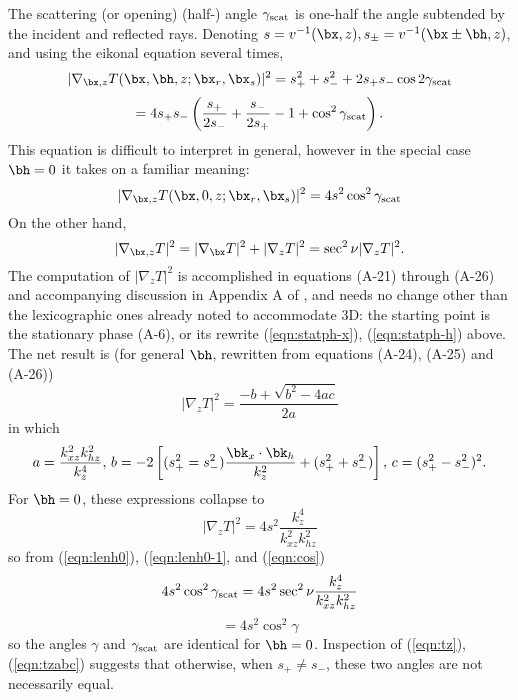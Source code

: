The scattering (or opening) (half-) angle $\gamma_{\rm scat}$ is one-half the angle subtended by the incident and reflected rays. Denoting $s=v^{-1}(\bx,z), s_{\pm} = v^{-1}(\bx \pm \bh,z)$, and using the eikonal equation several times,
\[
|\nabla_{\bx,z}T(\bx,\bh,z;\bx_r,\bx_s)|^2 = s_+^2 + s_-^2 + 2s_+s_-\cos 2 \gamma_{\rm scat}
\]
\begin{equation}
\label{eqn:len}
= 4s_+s_-\left(\frac{s_+}{2s_-}+\frac{s_-}{2s_+}  -1 + \cos^2 \gamma_{\rm scat}\right). 
\end{equation}
This equation is difficult to interpret in general, however in the special case $\bh=0$ it takes on a familiar meaning:
\begin{equation}
\label{eqn:lenh0}
|\nabla_{\bx,z}T(\bx,0,z;\bx_r,\bx_s)|^2 = 4 s^2 \cos^2 \gamma_{\rm scat}
\end{equation}
On the other hand,
\begin{equation}
\label{eqn:lenh0-1}
|\nabla_{\bx,z}T|^2 = |\nabla_{\bx}T|^2 + |\nabla_zT|^2 
=\sec^2\nu |\nabla_z T|^2.
\end{equation}
The computation of $|\nabla_zT|^2$ is accomplished in equations (A-21) through (A-26) and accompanying discussion in Appendix A of \cite{HouSymes:15}, and needs no change other than the lexicographic ones already noted to accommodate 3D: the starting point is the stationary phase (A-6), or its rewrite (\ref{eqn:statph-x}), (\ref{eqn:statph-h}) above. The net result is (for general $\bh$, rewritten from equations (A-24), (A-25) and (A-26))
\begin{equation}
\label{eqn:tz}
|\nabla_z T|^2 = \frac{-b + \sqrt{b^2-4ac}}{2a}
\end{equation}
in which
\begin{equation}
\label{eqn:tzabc}
a = \frac{k_{xz}^2k_{hz}^2}{k_z^4},\,b=-2\left[(s_+^2=s_-^2)\frac{\bk_x\cdot \bk_h}{k_z^2}+(s_+^2+s_-^2)\right],\, c=(s_+^2-s_-^2)^2.
\end{equation}
For $\bh=0$, these expressions collapse to
\begin{equation}
\label{eqn:tzh0}
|\nabla_z T|^2 = 4s^2 \frac{k_z^4}{k_{xz}^2k_{hz}^2}
\end{equation}
so from (\ref{eqn:lenh0}), (\ref{eqn:lenh0-1}, and (\ref{eqn:cos})
\[
4 s^2 \cos^2 \gamma_{\rm scat} = 4 s^2 \sec^2\nu  \frac{k_z^4}{k_{xz}^2k_{hz}^2}
\]
\begin{equation}
\label{scatid}
=4 s^2 \cos^2 \gamma
\end{equation}
so the angles $\gamma$ and $\gamma_{\rm scat}$ are identical for $\bh=0$. Inspection of (\ref{eqn:tz}), (\ref{eqn:tzabc}) suggests that otherwise, when $s_+ \ne s_-$, these two angles are not necessarily equal.

